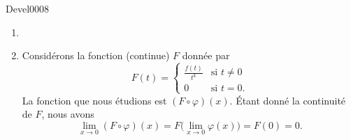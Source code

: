 
\begin{corrige}{Devel0008}

\begin{enumerate}

\item
\item
Considérons la fonction (continue) $F$ donnée par
\begin{equation}
	F(t)=\begin{cases}
	\frac{ f(t) }{ t^k }	&	\text{si $t\neq 0$}\\
	0	&	 \text{si $t=0$}.
\end{cases}
\end{equation}
La fonction que nous étudions est $(F\circ \varphi)(x)$. Étant donné la continuité de $F$, nous avons
\begin{equation}
	\lim_{x\to 0} (F\circ\varphi)(x)=F\big( \lim_{x\to 0} \varphi(x) \big)=F(0)=0.
\end{equation}

\end{enumerate}


\end{corrige}
